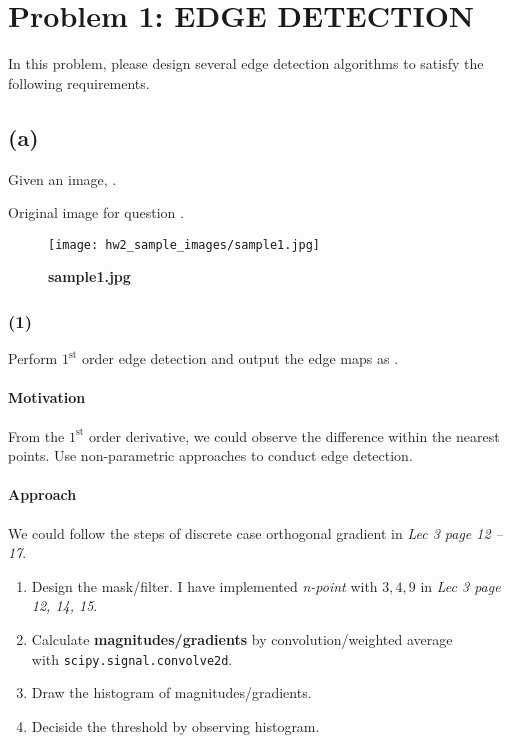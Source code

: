 \section{Problem 1: EDGE DETECTION}\label{problem-1-edge-detection}
In this problem, please design several edge detection algorithms to satisfy the following requirements.

\subsection{(a)}\label{1_a}
Given an image, .

Original image  for question .
\begin{figure}
    \centering
    \texttt{[image: hw2\_sample\_images/sample1.jpg]}
    \caption{\textbf{sample1.jpg}}
    \label{sample1}
\end{figure}

\subsubsection{(1)}
Perform $1^{\mbox{st}}$ order edge detection and output the edge maps as .

\paragraph{Motivation}
From the $1^{\mbox{st}}$ order derivative, we could observe the difference within the nearest points. Use non-parametric approaches to conduct edge detection.

\paragraph{Approach}
We could follow the steps of discrete case orthogonal gradient in \textit{Lec 3 page 12 -- 17}.
\begin{enumerate}
    \item Design the mask/filter. I have implemented \textit{n-point} with \(3, 4, 9\) in \textit{Lec 3 page 12, 14, 15}.
    \item Calculate \textbf{magnitudes/gradients} by convolution/weighted average \\
    with \texttt{scipy.signal.convolve2d}.
    \item Draw the histogram of magnitudes/gradients.
    \item Deciside the threshold by observing histogram.
\end{enumerate}

